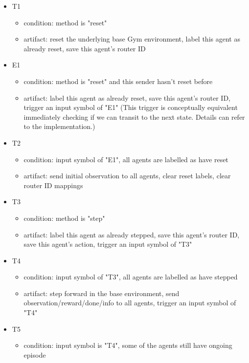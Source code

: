 \begin{itemize}
    \item T1
    \begin{itemize}
        \item condition: method is "reset"
        \item artifact: reset the underlying base Gym environment, label this agent as already reset, save this agent's router ID
    \end{itemize}
    \item E1
    \begin{itemize}
        \item condition: method is "reset" and this sender hasn't reset before
        \item artifact: label this agent as already reset, save this agent's router ID, trigger an input symbol of "E1" (This trigger is conceptually equivalent immediately checking if we can transit to the next state. Details can refer to the implementation.)
    \end{itemize}
    \item T2
    \begin{itemize}
        \item condition: input symbol of "E1", all agents are labelled as have reset
        \item artifact: send initial observation to all agents, clear reset labels, clear router ID mappings
    \end{itemize}
    \item T3
    \begin{itemize}
        \item condition: method is "step"
        \item artifact: label this agent as already stepped, save this agent's router ID, save this agent's action, trigger an input symbol of "T3"
    \end{itemize}
    \item T4
    \begin{itemize}
        \item condition: input symbol of "T3", all agents are labelled as have stepped
        \item artifact: step forward in the base environment, send observation/reward/done/info to all agents, trigger an input symbol of "T4"
    \end{itemize}
    \item T5
    \begin{itemize}
        \item condition: input symbol is "T4", some of the agents still have ongoing episode

\end{itemize}
\end{itemize}
